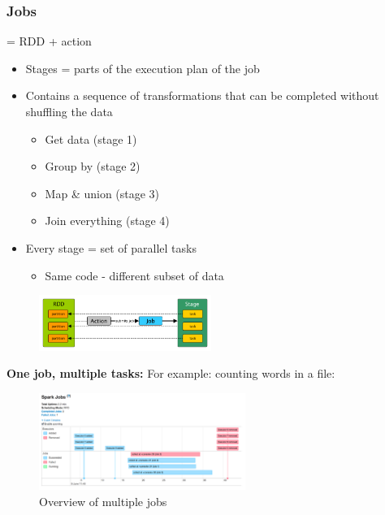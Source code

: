 \documentclass{article}
\begin{document}
\subsubsection{Jobs}

= RDD + action

\begin{itemize}
    \item Stages = parts of the execution plan of the job
    \item Contains a sequence of transformations that can be completed without shuffling the data
    \begin{itemize}
        \item Get data (stage 1)
        \item Group by (stage 2)
        \item Map \& union (stage 3)
        \item Join everything (stage 4)
    \end{itemize}
    \item Every stage = set of parallel tasks
    \begin{itemize}
        \item Same code - different subset of data
    \end{itemize}
\end{itemize}

\begin{figure}[H]
    \centering
    \includegraphics[width=0.5\textwidth]{spark-jobs.png}
\end{figure}

\textbf{One job, multiple tasks:} For example: counting words in a file:

\begin{figure}[H]
    \centering
    \includegraphics[width=0.6\textwidth]{spark-jobs3.png}
    \caption{Overview of multiple jobs}
\end{figure}
\end{document}
